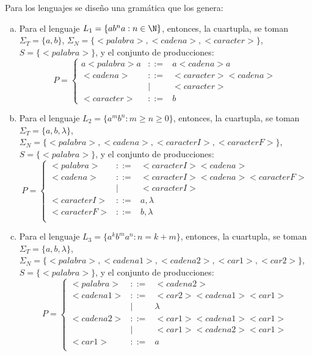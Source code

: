 \begin{mdframed}[style = warning]
	\begin{problem}
		Para los lenguajes se diseño una gramática que los genera:
			\begin{enumerate}[a)]
				\item Para el lenguaje $L_1 = \{ ab^n a:n\in \N \}$, entonces, la cuartupla, se toman $\Sigma _T = \{ a,b \}$, $\Sigma _N = \{ <palabra>,<cadena>,<caracter> \}$, $S = \{ <palabra> \}$, y el conjunto de producciones:
					$$
					P = \left\{\begin{array}{ccc}
					a<palabra>a & ::= & a<cadena>a \\
					<cadena> & ::= & <caracter><cadena> \\
					& | & <caracter> \\
					<caracter> & ::= & b					
					\end{array}\right.
					$$
				\item Para el lenguaje $L_2 = \{ a^m b^n:m\geq n\geq 0 \}$, entonces, la cuartupla, se toman $\Sigma _T = \{ a,b,\lambda \}$, $\Sigma _N = \{ <palabra>,<cadena>,<caracterI>,<caracterF> \}$, $S = \{ <palabra> \}$, y el conjunto de producciones:
					$$
					P = \left\{\begin{array}{ccc}
					<palabra> & ::= & <caracterI><cadena> \\
					<cadena> & ::= & <caracterI><cadena><caracterF> \\
					& | & <caracterI> \\
					<caracterI> & ::= & a,\lambda \\
					<caracterF> & ::= & b,\lambda \\
					\end{array}\right.
					$$
				\item Para el lenguaje $L_3 = \{ a^k b^m a^n: n = k + m \}$, entonces, la cuartupla, se toman $\Sigma _T = \{ a,b,\lambda \}$, $\Sigma _N = \{ <palabra>,<cadena1>,<cadena2>,<car1>,<car2> \}$, $S = \{ <palabra> \}$, y el conjunto de producciones:
					$$
					P = \left\{\begin{array}{ccc}
					<palabra> & ::= & <cadena2> \\
					<cadena1> & ::= & <car2><cadena1><car1> \\
					& | & \lambda \\
					<cadena2> & ::= & <car1><cadena1><car1> \\
					& | & <car1><cadena2><car1> \\
					<car1> & ::= & a \\

\end{array}$$
\end{enumerate}
\end{problem}
\end{mdframed}
